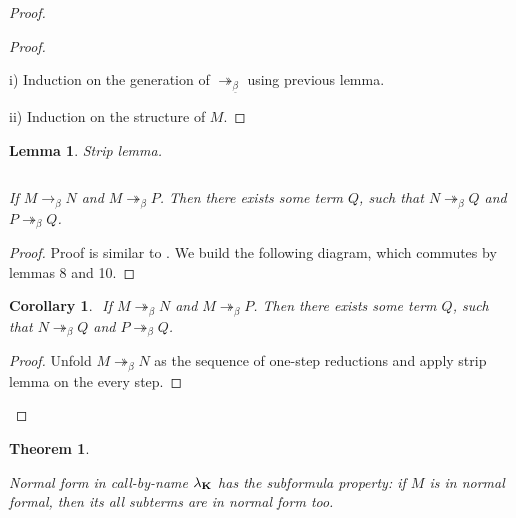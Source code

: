 \documentclass[a4paper]{article}
\newtheorem{theorem}{Theorem}
\newtheorem{lemma}{Lemma}
\newtheorem{col}{Corollary}
\begin{document}
\begin{proof}
\begin{proof}
  $ $

  i) Induction on the generation of $\twoheadrightarrow_{\underline{\beta}}$ using previous lemma.

  ii) Induction on the structure of $M$.
\end{proof}

\begin{lemma} Strip lemma.

$ $

If $M \rightarrow_{\beta} N$ and $M \twoheadrightarrow_{\beta} P$. Then there exists some term $Q$, such that
$N \twoheadrightarrow_{\beta} Q$ and $P \twoheadrightarrow_{\beta} Q$.
\end{lemma}

\begin{proof}

Proof is similar to \cite{Baren} \cite{Baren2}. We build the following diagram, which commutes by lemmas 8 and 10.

\vspace{\baselineskip}

\end{proof}

\begin{col}
$ $
If $M \twoheadrightarrow_{\beta} N$ and $M \twoheadrightarrow_{\beta} P$. Then there exists some term $Q$, such that
$N \twoheadrightarrow_{\beta} Q$ and $P \twoheadrightarrow_{\beta} Q$.
\end{col}

\begin{proof}

  Unfold $M \twoheadrightarrow_{\beta} N$ as the sequence of one-step reductions and apply strip lemma on the every step.
\end{proof}

\end{proof}

\begin{theorem}
  $ $

  Normal form in call-by-name $\lambda_{{\bf K}}$ has the subformula property: if $M$ is in normal formal, then its all subterms are in normal form too.

\end{theorem}
\end{document}
